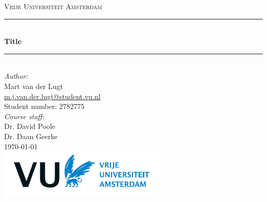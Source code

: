 \documentclass[a4paper]{article}
\renewenvironment{abstract}{\vspace{0.5ex}\begin{quote}}{\par\end{quote}\vskip 1ex\hrule\vskip 2ex}
\begin{document}
\begin{titlepage}

\newcommand{\HRule}{\rule{\linewidth}{0.5mm}} 							%
\center 
 
\textsc{\LARGE Vrije Universiteit Amsterdam}\\[3.6cm]


\HRule \\[0.8cm]
{ \huge \bfseries Title}\\[0.8cm]								%
\HRule \\[2cm]
\large
\emph{Author:}\\[0.1cm]
Mart van der Lugt \\ {\href{mailto:m.j.van.der.lugt@student.vu.nl}{m.j.van.der.lugt@student.vu.nl}} \\ {\footnotesize Student number: 2782775}\\[2.4cm]	%

\emph{Course staff:}\\[0.1cm]
Dr. David Poole\\[0.1cm]
Dr. Daan Geerke\\[1.0cm]

{\large \today}\\[2.6cm]
\includegraphics[width=0.6\textwidth]{figures/VU-logo_druk.pdf}\\[1cm] 	%
\vfill 
\end{titlepage}


\tableofcontents
\newpage

\twocolumn









\onecolumn
\end{document}
